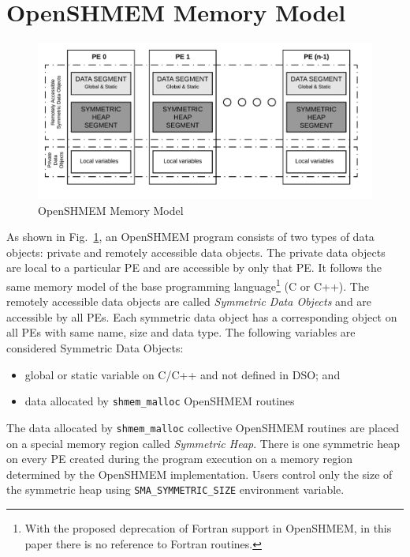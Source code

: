 \section{OpenSHMEM Memory Model}
\label{src:mmodel}
\begin{figure}[!h]
    \vspace{-30pt}
    \hspace*{5mm}
    \includegraphics[scale=0.20]{image/osm-mmodel.png}
    \vspace{-25pt}
    \caption{OpenSHMEM Memory Model}
    \vspace{-20pt}
    \label{fig:mmodel}
\end{figure}

As shown in Fig.~\ref{fig:mmodel}, an OpenSHMEM program consists of
two types of data objects: private and remotely
accessible data objects.
The private data objects are local
to a particular PE and are accessible by only that PE. It follows the
same memory model of the base programming language\footnote{With the
proposed deprecation of Fortran support in OpenSHMEM, in this paper
there is no reference to Fortran routines.} (C or C++). The
remotely accessible data objects are called
\emph{Symmetric Data Objects} and are accessible by all PEs.
Each symmetric data object has a corresponding object on all PEs
with same %
name, size and data type.%
The following variables are considered
Symmetric Data Objects:
\begin{itemize}
    \item global or static variable on C/C++ and not defined in DSO; and
    \item data allocated by \texttt{shmem\_malloc} OpenSHMEM routines
\end{itemize}

The data allocated by \texttt{shmem\_malloc} collective OpenSHMEM
routines are placed on a special memory region called \emph{Symmetric
Heap}. There is one symmetric heap on every PE created during the program
execution on a memory region determined by the OpenSHMEM implementation.
Users
control only the size of the symmetric heap using
\texttt{SMA\_SYMMETRIC\_SIZE} environment variable.

